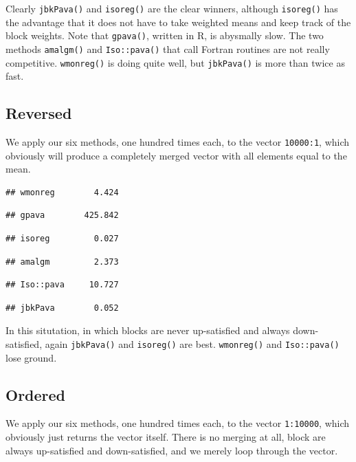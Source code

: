 \documentclass[12pt,]{article}
\begin{document}
Clearly \texttt{jbkPava()} and \texttt{isoreg()} are the clear winners,
although \texttt{isoreg()} has the advantage that it does not have to
take weighted means and keep track of the block weights. Note that
\texttt{gpava()}, written in R, is abysmally slow. The two methods
\texttt{amalgm()} and \texttt{Iso::pava()} that call Fortran routines
are not really competitive. \texttt{wmonreg()} is doing quite well, but
\texttt{jbkPava()} is more than twice as fast.

\subsection{Reversed}\label{reversed}

We apply our six methods, one hundred times each, to the vector
\texttt{10000:1}, which obviously will produce a completely merged
vector with all elements equal to the mean.

\begin{verbatim}
## wmonreg        4.424
\end{verbatim}

\begin{verbatim}
## gpava        425.842
\end{verbatim}

\begin{verbatim}
## isoreg         0.027
\end{verbatim}

\begin{verbatim}
## amalgm         2.373
\end{verbatim}

\begin{verbatim}
## Iso::pava     10.727
\end{verbatim}

\begin{verbatim}
## jbkPava        0.052
\end{verbatim}

In this situtation, in which blocks are never up-satisfied and always
down-satisfied, again \texttt{jbkPava()} and \texttt{isoreg()} are best.
\texttt{wmonreg()} and \texttt{Iso::pava()} lose ground.

\subsection{Ordered}\label{ordered}

We apply our six methods, one hundred times each, to the vector
\texttt{1:10000}, which obviously just returns the vector itself. There
is no merging at all, block are always up-satisfied and down-satisfied,
and we merely loop through the vector.
\end{document}
